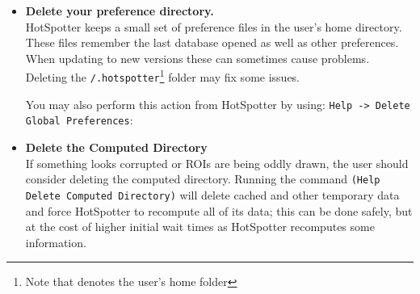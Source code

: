 \documentclass[a4paper,10pt]{article}
\begin{document}
\begin{itemize}
    \item \textbf{Delete your preference directory.}\\
        HotSpotter keeps a small set of preference files in the user's  home directory.
        These files remember the last database opened as well as other
        preferences. When updating to new versions these can sometimes cause
        problems. Deleting the {\tt \texttildelow/.hotspotter}\footnote{Note
            that {\tt \texttildelow} denotes the user's home folder} folder may fix some issues.
            
        You may also perform this action from HotSpotter by using: \verb+Help -> Delete Global Preferences+: \\


    \item \textbf{Delete the Computed Directory}\\
        If something looks corrupted or ROIs are being oddly drawn, the user
        should consider deleting the computed directory.  Running  the command 
        {\tt (Help \textrightarrow{} Delete Computed Directory)} will delete cached and 
	other temporary data and force HotSpotter to recompute all of its data; this can be done safely, but at the cost of 
	higher initial wait times as HotSpotter recomputes some information. \\



\end{itemize}
\end{document}
